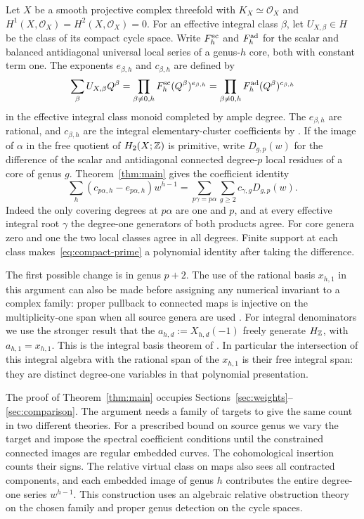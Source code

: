 Let $X$ be a smooth projective complex threefold with
$K_X\simeq\mathcal O_X$ and $H^1(X,\mathcal O_X)=H^2(X,\mathcal O_X)=0$.
For an effective integral class $\beta$, let $U_{X,\beta}\in H$ be
the class of its compact cycle space. Write $F_h^{\rm sc}$ and
$F_h^{\rm ad}$ for the scalar and balanced antidiagonal universal
local series of a genus-$h$ core, both with constant term one.
The exponents $e_{\beta,h}$ and $c_{\beta,h}$ are defined by
\[
 \sum_\beta U_{X,\beta}Q^\beta
    =\prod_{\beta\ne0,h}F_h^{\rm sc}(Q^\beta)^{e_{\beta,h}}
    =\prod_{\beta\ne0,h}F_h^{\rm ad}(Q^\beta)^{c_{\beta,h}}
\]
in the effective integral class monoid completed by ample degree.
The $e_{\beta,h}$ are rational, and $c_{\beta,h}$ are the integral
elementary-cluster coefficients by \cite[Theorem~1.1]{WueProduct}.
If the image of $\alpha$ in the free
quotient of $H_2(X;\mathbb Z)$ is primitive, write
$D_{g,p}(w)$ for the difference of the scalar and antidiagonal connected
degree-$p$ local residues of a core of genus $g$. Theorem~\ref{thm:main}
gives the coefficient identity
\begin{equation}\label{eq:compact-prime}
 \sum_h(c_{p\alpha,h}-e_{p\alpha,h})w^{h-1}
    = \sum_{p\gamma=p\alpha}\sum_{g\ge2}c_{\gamma,g}D_{g,p}(w).
\end{equation}
Indeed the only covering degrees at $p\alpha$ are one and $p$, and at
every effective integral root $\gamma$ the degree-one generators of both
products agree. For core genera zero and one the two local classes
agree in all degrees. Finite support at each class makes~\eqref{eq:compact-prime}
a polynomial identity after taking the difference.

The first possible change is in genus $p+2$. The use of the rational
basis $x_{h,1}$ in this argument can also be made before assigning any
numerical invariant to a complex family: proper pullback to connected
maps is injective on the multiplicity-one span when all source genera
are used \cite[Sections 5--7]{WueProduct}. For integral denominators we
use the stronger result that the $a_{h,d}:=X_{h,d}(-1)$ freely generate
$H_{\mathbb Z}$, with $a_{h,1}=x_{h,1}$. This is the integral basis theorem
of \cite[Theorem~1.1]{WueGenerators}. In particular the intersection of
this integral algebra with the rational span of the $x_{h,1}$ is
their free integral span: they are distinct degree-one variables
in that polynomial presentation.

The proof of Theorem~\ref{thm:main} occupies
Sections~\ref{sec:weights}--\ref{sec:comparison}. The argument needs
a family of targets to give the same count in two different theories.
For a prescribed bound on source genus we vary the target and impose
the spectral coefficient conditions until the constrained connected
images are regular embedded curves. The cohomological insertion
counts their signs. The relative virtual class on maps also sees all
contracted components, and each embedded image of genus $h$ contributes
the entire degree-one series $w^{h-1}$. This construction uses an
algebraic relative obstruction theory on the chosen family and
proper genus detection on the cycle spaces.
